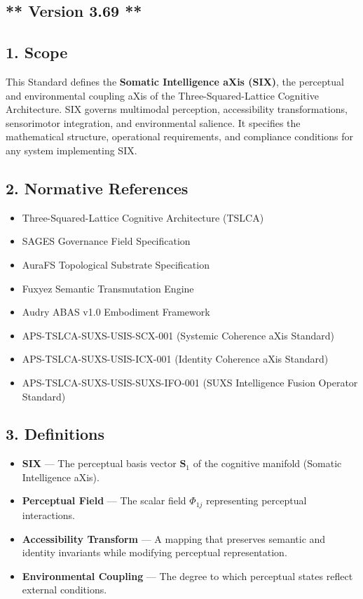 \subsection{** Version 3.69 **}\label{version-3.69}

\subsection{1. Scope}\label{scope}

This Standard defines the \textbf{Somatic Intelligence aXis (SIX)}, the perceptual and environmental coupling aXis of the Three-Squared-Lattice Cognitive Architecture. SIX governs multimodal perception, accessibility transformations, sensorimotor integration, and environmental salience. It specifies the mathematical structure, operational requirements, and compliance conditions for any system implementing SIX.

\subsection{2. Normative References}\label{normative-references}

\begin{itemize}
\tightlist
\item
  Three-Squared-Lattice Cognitive Architecture (TSLCA)
\item
  SAGES Governance Field Specification
\item
  AuraFS Topological Substrate Specification
\item
  Fuxyez Semantic Transmutation Engine
\item
  Audry ABAS v1.0 Embodiment Framework
\item
  APS-TSLCA-SUXS-USIS-SCX-001 (Systemic Coherence aXis Standard)
\item
  APS-TSLCA-SUXS-USIS-ICX-001 (Identity Coherence aXis Standard)
\item
  APS-TSLCA-SUXS-USIS-SUXS-IFO-001 (SUXS Intelligence Fusion Operator Standard)
\end{itemize}

\subsection{3. Definitions}\label{definitions}

\begin{itemize}
\tightlist
\item
  \textbf{SIX} --- The perceptual basis vector \(\mathbf{S}_1\) of the cognitive manifold (Somatic Intelligence aXis).
\item
  \textbf{Perceptual Field} --- The scalar field \(\Phi_{1j}\) representing perceptual interactions.
\item
  \textbf{Accessibility Transform} --- A mapping that preserves semantic and identity invariants while modifying perceptual representation.
\item
  \textbf{Environmental Coupling} --- The degree to which perceptual states reflect external conditions.
\end{itemize}

